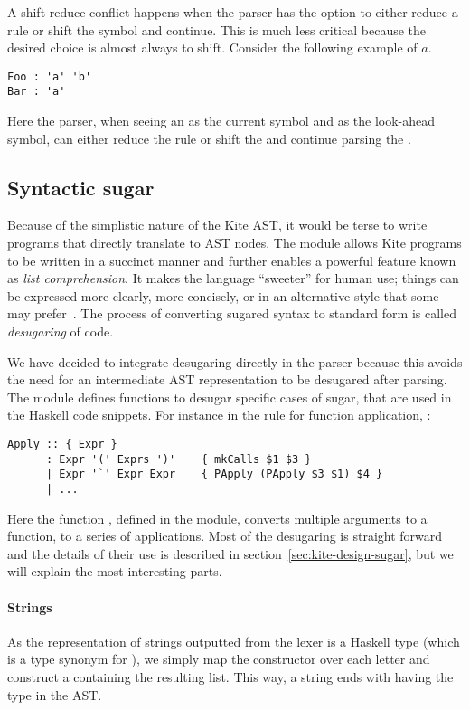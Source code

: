 A shift-reduce conflict happens when the parser has the option to either reduce a rule or shift the symbol and continue. This is much less critical because the desired choice is almost always to shift. Consider the following example of $a$.

\begin{lstlisting}
Foo : 'a' 'b'
Bar : 'a'
\end{lstlisting}

Here the parser, when seeing an  as the current symbol and  as the look-ahead symbol, can either reduce the  rule or shift the  and continue parsing the .


\subsection{Syntactic sugar}
\label{sec:imp-sugar}
Because of the simplistic nature of the Kite AST, it would be terse to write programs that directly translate to AST nodes. The  module allows Kite programs to be written in a succinct manner and further enables a powerful feature known as \emph{list comprehension}. It makes the language ``sweeter'' for human use; things can be expressed more clearly, more concisely, or in an alternative style that some may prefer~\cite{wiki-sugar14}. The process of converting sugared syntax to standard form is called \emph{desugaring} of code.

We have decided to integrate desugaring directly in the parser because this avoids the need for an intermediate AST representation to be desugared after parsing. The  module defines functions to desugar specific cases of sugar, that are used in the Haskell code snippets. For instance in the rule for function application, :

\begin{lstlisting}
Apply :: { Expr }
      : Expr '(' Exprs ')'    { mkCalls $1 $3 }
      | Expr '`' Expr Expr    { PApply (PApply $3 $1) $4 }
      | ...
\end{lstlisting}

Here the function , defined in the  module, converts multiple arguments to a function, to a series of applications. Most of the desugaring is straight forward and the details of their use is described in section~\ref{sec:kite-design-sugar}, but we will explain the most interesting parts.

\paragraph{Strings}
As the representation of strings outputted from the lexer is a Haskell  type (which is a type synonym for \code{[Char]}), we simply map the  constructor over each letter and construct a  containing the resulting list. This way, a string ends with having the type  in the AST.

